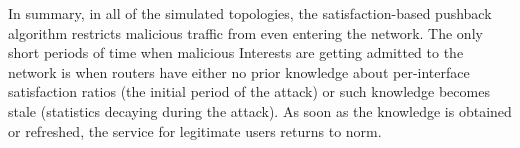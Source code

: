 In summary, in all of the simulated topologies, the satisfaction-based pushback algorithm restricts malicious traffic from even entering the network.
The only short periods of time when malicious Interests are getting admitted to the network is when routers have either no prior knowledge about per-interface satisfaction ratios (the initial period of the attack) or such knowledge becomes stale (statistics decaying during the attack).
As soon as the knowledge is obtained or refreshed, the service for legitimate users returns to norm.





